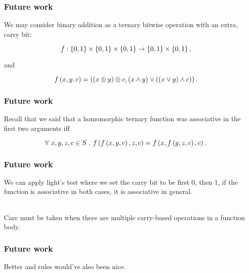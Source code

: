 \begin{frame}[plain]

\frametitle{Future work}

We may consider binary addition as a ternary bitwise operation with an extra,
carry bit:

\[f : \left\{{0,1}\right\} \times \left\{{0,1}\right\} \times \left\{{0,1}\right\} \rightarrow \left\{{0,1}\right\} \times
\left\{{0,1}\right\},\]

and

\[f\left({x,y,c}\right)=\left({\left({x \oplus y}\right) \oplus c, \left({x \wedge y}\right) \vee \left({ \left({ x \vee y}\right)
\wedge c}\right)}\right).\]

\end{frame}

\begin{frame}[plain]

\frametitle{Future work}

Recall that we said that a homomorphic ternary function was associative in the
first two arguments iff

\[\forall\ x,y,z,c\in S\ .\ f\p{f\p{x,y,c}, z,c} = f\p{x, f\p{y,z,c},c}.\]

\end{frame}

\begin{frame}[plain]

\frametitle{Future work}

We can apply light's test where we set the carry bit to be first 0, then 1, if
the function is associative in both cases, it is associative in general.

\ \\

Care must be taken when there are multiple carry-based operations in a function
body.

\end{frame}

\begin{frame}[plain]

\frametitle{Future work}

Better \LMIN and \LMAX rules would've also been nice.

\end{frame}
